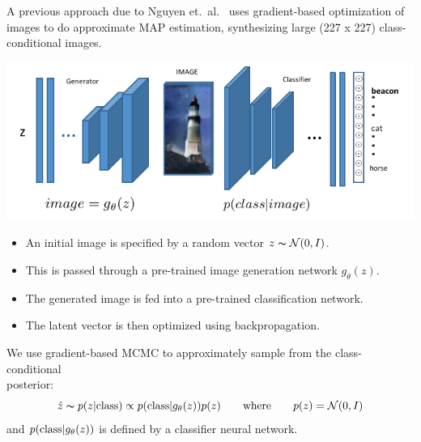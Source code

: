 \documentclass[landscape,a0b,final,a4resizeable]{include/a0poster}
\begin{document}
\begin{poster}
\begin{multicols}{3}
\vspace{0.5in}

% 
A previous approach due to Nguyen et.\ al.\ \cite{Nguyen2016} uses gradient-based optimization of images to do approximate 
 MAP estimation, synthesizing large (227 x 227) class-conditional images.\\

\begin{center} 
  \centering
  \includegraphics{figures/img}
  \label{fig:net}
\end{center}

\begin{itemize}
\item An initial image is specified by a random vector $z \thicksim \mathcal{N}(0, I)$.
 \item This is passed through a pre-trained image generation network $g_\theta(z)$.
\item The generated image is fed into a pre-trained classification network.
 \item The latent vector is then optimized using backpropagation.
\end{itemize}
\vspace{1cm}
We use gradient-based MCMC to approximately sample from the class-conditional \\posterior:\\
\begin{equation*}
    \hat z \thicksim p(z|\textnormal{class}) \propto p(\textnormal{class} | g_\theta(z)) p(z) \qquad \textnormal{where} \qquad p(z) = \mathcal{N}(0, I)
\end{equation*}
\linebreak
and $p(\textnormal{class} | g_\theta(z))$ is defined by a classifier neural network.\\


\end{multicols}
\end{poster}
\end{document}
